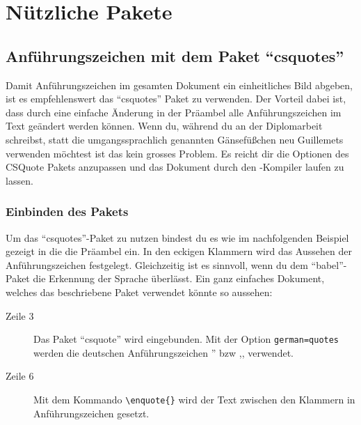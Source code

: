 %
%

\chapter{Nützliche Pakete}

\section{Anführungszeichen mit dem Paket \enquote{csquotes}}
\label{sec:anfuehrungszeichen}

Damit Anführungszeichen im gesamten Dokument ein einheitliches Bild abgeben, ist es empfehlenswert das \enquote{csquotes} Paket zu verwenden. Der Vorteil dabei ist, dass durch eine einfache Änderung in der Präambel alle Anführungszeichen im Text geändert werden können. Wenn du, während du an der Diplomarbeit schreibst, statt die umgangssprachlich genannten Gänsefüßchen neu Guillemets verwenden möchtest ist das kein grosses Problem. Es reicht dir die Optionen des CSQuote Pakets anzupassen und das Dokument durch den \DMLLaTeX-Kompiler laufen zu lassen.

\subsection{Einbinden des Pakets}

Um das \enquote{csquotes}-Paket zu nutzen bindest du es wie im nachfolgenden Beispiel gezeigt in die die Präambel ein. In den eckigen Klammern wird das Aussehen der Anführungszeichen festgelegt. Gleichzeitig ist es sinnvoll, wenn du dem \enquote{babel}-Paket die Erkennung der Sprache überlässt. Ein ganz einfaches Dokument, welches das beschriebene Paket verwendet könnte so aussehen:



\begin{description}
\item[Zeile 3] Das Paket \enquote{csquote} wird eingebunden. Mit der Option \texttt{german=quotes} werden die deutschen Anführungszeichen '' bzw ,, verwendet.
\item[Zeile 6] Mit dem Kommando \texttt{\textbackslash enquote\{\}} wird der Text zwischen den Klammern in Anführungszeichen gesetzt.
\end{description}

